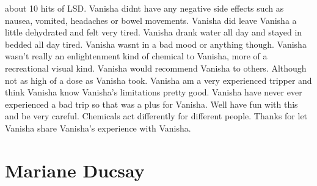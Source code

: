 \documentclass[12pt]{book}
\begin{document}
about 10 hits of LSD. Vanisha didnt have any negative side effects such as nausea, vomited, headaches or bowel movements. Vanisha did leave Vanisha a little dehydrated and felt very tired. Vanisha drank water all day and stayed in bedded all day tired. Vanisha wasnt in a bad mood or anything though. Vanisha wasn't really an enlightenment kind of chemical to Vanisha, more of a recreational visual kind. Vanisha would recommend Vanisha to others. Although not as high of a dose as Vanisha took. Vanisha am a very experienced tripper and think Vanisha know Vanisha's limitations pretty good. Vanisha have never ever experienced a bad trip so that was a plus for Vanisha. Well have fun with this and be very careful. Chemicals act differently for different people. Thanks for let Vanisha share Vanisha's experience with Vanisha.



\chapter{Mariane Ducsay}
\end{document}
